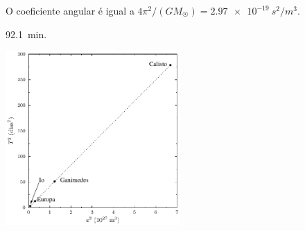 \documentclass[a4paper]{article}
\begin{document}
\begin{respostas}
\begin{exercicio}
\begin{compactenum}[(a)]
  \item O coeficiente angular é igual a $4\pi^2/(GM_{\astrosun}) = \SI{2.97e-19}{s^2/m^3}$.
  
  \end{compactenum}
  \end{exercicio}
  
  \begin{exercicio}
   \SI{92.1}{min}.
  \end{exercicio}
  
  \begin{exercicio*}
    \begin{center}
      \includegraphics[width=0.5\textwidth]{Io_cia}
    \end{center}
  \end{exercicio*}
\end{respostas}
\end{document}
